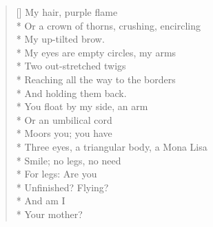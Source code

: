 \label{ch:onnena}
\settowidth{\versewidth}{Three eyes, a triangular body, a Mona Lisa}
\begin{verse}[\versewidth]
My hair, purple flame\\*
Or a crown of thorns, crushing, encircling\\*
My up-tilted brow.\\*
My eyes are empty circles, my arms\\*
Two out-stretched twigs\\*
Reaching all the way to the borders\\*
And holding them back.\\*
You float by my side, an arm\\*
Or an umbilical cord\\*
Moors you; you have\\*
Three eyes, a triangular body, a Mona Lisa\\*
Smile; no legs, no need\\*
For legs: Are you\\*
Unfinished? Flying?\\*
And am I\\*
Your mother?
\end{verse}
